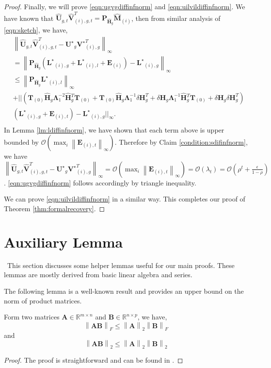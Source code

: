 \documentclass[twoside,11pt]{article}
\newcommand{\norm}[1]{\left\lVert#1\right\rVert}
\newcommand{\matA}{\mathbf{A}}
\newcommand{\matB}{\mathbf{B}}
\newcommand{\matE}{\mathbf{E}}
\newcommand{\hmatH}{{\hat{\mathbf{H}}}{}}
\newcommand{\matLst}{{\mathbf{L}^\star}}
\newcommand{\matP}{\mathbf{P}}
\newcommand{\matT}{\mathbf{T}}
\newcommand{\matLambda}{\mathbf{\Lambda}}
\newcommand{\matUst}{{\mathbf{U}^\star}}
\newcommand{\dtmatH}{\delta\mathbf{H}}
\newcommand{\matVst}{{\mathbf{V}^\star}}
\newcommand{\hmatM}{\hat{\mathbf{M}}}
\newcommand{\hmatU}{\hat{\mathbf{U}}}
\newcommand{\hmatV}{\hat{\mathbf{V}}}
\begin{document}
\begin{proof}
Finally, we will prove \eqref{eqn:ugvgdiffinfnorm} and \eqref{eqn:uilvildiffinfnorm}. We have known that $\hmatU_{g,t}\hmatV_{(i),g,t}^T=\matP_{\hmatH_g}\hmatM_{(i)}$, then from similar analysis of \eqref{eqn:sketch}, we have,
$$
\begin{aligned}
&\norm{\hmatU_{g,t}\hmatV_{(i),g,t}^T-\matUst_{g}\matVst_{(i),g}^T}_{\infty}\\
&=\norm{\matP_{\hmatH_g}\left(\matLst_{(i),g}+\matLst_{(i),l}+\matE_{(i)}\right)- \matLst_{(i),g}}_{\infty}\\
&\le\norm{\matP_{\hmatH_g}\matLst_{(i),l} }_{\infty}\\
&+\Big|\Big|\left(\matT_{(0)}\hmatH_g\matLambda_1^{-2}\hmatH_g^T\matT_{(0)}+\matT_{(0)}\hmatH_g\matLambda_1^{-1}\dtmatH_g^T+\dtmatH_g\matLambda_1^{-1}\hmatH_g^T\matT_{(0)}+\dtmatH_g\dtmatH_g^T\right)\\
&(\matLst_{(i),g}+\matE_{(i),t})-\matLst_{(i),g} \Big|\Big|_{\infty}.\\
\end{aligned}
$$
In Lemma \ref{lm:ldiffinfnorm}, we have shown that each term above is upper bounded by $\mathcal{O}(\max_i\norm{\matE_{(i),t}}_{\infty})$. Therefore by Claim \ref{condition:sdifinfnorm}, we have $\norm{\hmatU_{g,t}\hmatV_{(i),g,t}^T-\matUst_{g}\matVst_{(i),g}^T}_{\infty}= \mathcal{O}(\max_i\norm{\matE_{(i),t}}_{\infty})=\mathcal{O}(\lambda_t)=\mathcal{O}(\rho^t+\frac{\epsilon}{1-\rho})$. \eqref{eqn:ugvgdiffinfnorm} follows accordingly by triangle inequality. 

We can prove \eqref{eqn:uilvildiffinfnorm} in a  similar way. This completes our proof of Theorem \ref{thm:formalrecovery}.
\end{proof}


\section{Auxiliary Lemma}\
This section discusses some helper lemmas useful for our main proofs. These lemmas are mostly derived from basic linear algebra and series.

The following lemma is a well-known result and provides an upper bound on the norm of product matrices.
\begin{lemma}
\label{lm:productupperbound}
Form two matrices $\matA\in\mathbb{R}^{m\times n}$ and $\matB\in\mathbb{R}^{n\times p}$, we have,
$$
\norm{\matA\matB}_F\le \norm{\matA}_2\norm{\matB}_F
$$
and
$$
\norm{\matA\matB}_2\le \norm{\matA}_2\norm{\matB}_2
$$
\end{lemma}
\begin{proof}
    The proof is straightforward and can be found in \cite{ruoyuconvergence}.
\end{proof}
\end{document}
